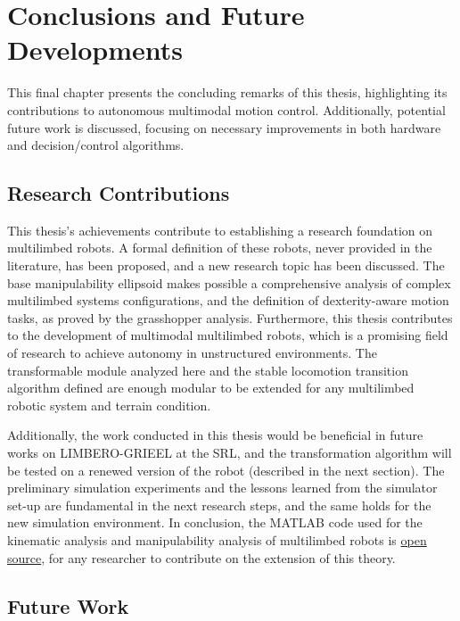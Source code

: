 \chapter{Conclusions and Future Developments}
\label{ch:chapter_nine}%

This final chapter presents the concluding remarks of this thesis, highlighting its contributions to autonomous multimodal motion control. Additionally, potential future work is discussed, focusing on necessary improvements in both hardware and decision/control algorithms.

\section{Research Contributions}
\label{sec:contribution}

This thesis's achievements contribute to establishing a research foundation on multilimbed robots. 
A formal definition of these robots, never provided in the literature, has been proposed, and a new research topic has been discussed. The base manipulability ellipsoid makes possible a comprehensive analysis of complex multilimbed systems configurations, and the definition of dexterity-aware motion tasks, as proved by the grasshopper analysis. 
Furthermore, this thesis contributes to the development of multimodal multilimbed robots, which is a promising field of research to achieve autonomy in unstructured environments. The transformable module analyzed here and the stable locomotion transition algorithm defined are enough modular to be extended for any multilimbed robotic system and terrain condition. 

Additionally, the work conducted in this thesis would be beneficial in future works on LIMBERO-GRIEEL at the SRL, and the transformation algorithm will be tested on a renewed version of the robot (described in the next section). The preliminary simulation experiments and the lessons learned from the simulator set-up are fundamental in the next research steps, and the same holds for the new simulation environment. In conclusion, the MATLAB code used for the kinematic analysis and manipulability analysis of multilimbed robots is \href{https://github.com/AlePuglisi/limbed-robot-control}{open source}, for any researcher to contribute on the extension of this theory. 

\section{Future Work}
\label{sec:future}

